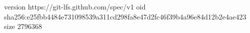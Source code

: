 version https://git-lfs.github.com/spec/v1
oid sha256:e25fbb4484e731098539a311cd298fa8e47d2fc46f39b4a96e84d12b2e4ae423
size 2796368
